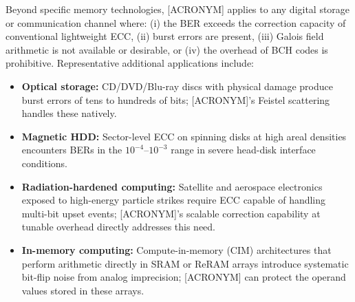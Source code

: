Beyond specific memory technologies, [ACRONYM] applies to any digital storage or communication channel where: (i) the BER exceeds the correction capacity of conventional lightweight ECC, (ii) burst errors are present, (iii) Galois field arithmetic is not available or desirable, or (iv) the overhead of BCH codes is prohibitive. Representative additional applications include:

\begin{itemize}
    \item \textbf{Optical storage:} CD/DVD/Blu-ray discs with physical damage produce burst errors of tens to hundreds of bits; [ACRONYM]'s Feistel scattering handles these natively.
    \item \textbf{Magnetic HDD:} Sector-level ECC on spinning disks at high areal densities encounters BERs in the $10^{-4}$--$10^{-3}$ range in severe head-disk interface conditions.
    \item \textbf{Radiation-hardened computing:} Satellite and aerospace electronics exposed to high-energy particle strikes require ECC capable of handling multi-bit upset events; [ACRONYM]'s scalable correction capability at tunable overhead directly addresses this need.
    \item \textbf{In-memory computing:} Compute-in-memory (CIM) architectures that perform arithmetic directly in SRAM or ReRAM arrays introduce systematic bit-flip noise from analog imprecision; [ACRONYM] can protect the operand values stored in these arrays.
\end{itemize}

